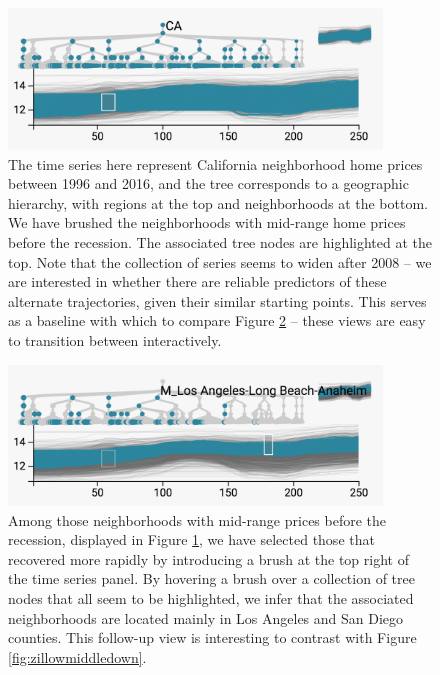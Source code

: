 \documentclass[12pt]{article}
\begin{document}
\begin{figure}

{\centering \includegraphics[width=375px]{figure/zillow_middle_pre}

}

\caption{The time series here represent California neighborhood home prices
  between 1996 and 2016, and the tree corresponds to a geographic hierarchy,
  with regions at the top and neighborhoods at the bottom. We have brushed the
  neighborhoods with mid-range home prices before the recession. The associated
  tree nodes are highlighted at the top. Note that the collection of series
  seems to widen after 2008 -- we are interested in whether there are reliable
  predictors of these alternate trajectories, given their similar starting
  points. This serves as a baseline with which to compare Figure
  \ref{fig:zillowmiddleup} -- these views are easy to transition between
  interactively.}\label{fig:zillowmiddlepre}
\end{figure}

\begin{figure}

{\centering \includegraphics[width=375px]{figure/zillow_middle_up}

}

\caption{Among those neighborhoods with mid-range prices before the recession,
  displayed in Figure \ref{fig:zillowmiddlepre}, we have selected those that
  recovered more rapidly by introducing a brush at the top right of the time
  series panel. By hovering a brush over a collection of tree nodes that all
  seem to be highlighted, we infer that the associated neighborhoods are located
  mainly in Los Angeles and San Diego counties. This follow-up view is
  interesting to contrast with Figure \ref{fig:zillowmiddledown}.
}\label{fig:zillowmiddleup}
\end{figure}
\end{document}
